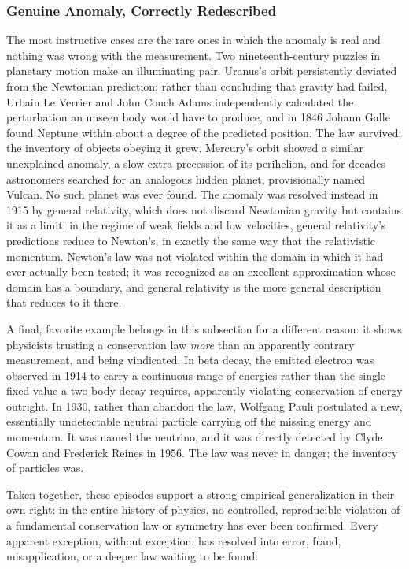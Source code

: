 \subsubsection{Genuine Anomaly, Correctly Redescribed}

The most instructive cases are the rare ones in which the anomaly is real
and nothing was wrong with the measurement. Two nineteenth-century puzzles
in planetary motion make an illuminating pair. Uranus's orbit persistently
deviated from the Newtonian prediction; rather than concluding that gravity
had failed, Urbain Le Verrier and John Couch Adams independently calculated
the perturbation an unseen body would have to produce, and in 1846 Johann
Galle found Neptune within about a degree of the predicted position. The
law survived; the inventory of objects obeying it grew. Mercury's orbit
showed a similar unexplained anomaly, a slow extra precession of its
perihelion, and for decades astronomers searched for an analogous hidden
planet, provisionally named Vulcan. No such planet was ever found. The
anomaly was resolved instead in 1915 by general relativity, which does not
discard Newtonian gravity but contains it as a limit: in the regime of
weak fields and low velocities, general relativity's predictions reduce to
Newton's, in exactly the same way that the relativistic momentum.
Newton's law was not violated within the domain in which it had ever
actually been tested; it was recognized as an excellent approximation
whose domain has a boundary, and general relativity is the more general
description that reduces to it there.

A final, favorite example belongs in this subsection for a different reason:
it shows physicists trusting a conservation law \emph{more} than an
apparently contrary measurement, and being vindicated. In beta decay, the
emitted electron was observed in 1914 to carry a continuous range of
energies rather than the single fixed value a two-body decay requires,
apparently violating conservation of energy outright. In 1930, rather than
abandon the law, Wolfgang Pauli postulated a new, essentially undetectable
neutral particle carrying off the missing energy and momentum. It was
named the neutrino, and it was directly detected by Clyde Cowan and
Frederick Reines in 1956. The law was never in danger; the inventory of
particles was.

Taken together, these episodes support a strong empirical generalization
in their own right: in the entire history of physics, no controlled,
reproducible violation of a fundamental conservation law or symmetry has
ever been confirmed. Every apparent exception, without exception, has
resolved into error, fraud, misapplication, or a deeper law waiting to be
found.

